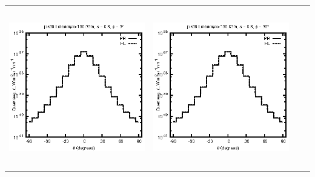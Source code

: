\begin{tabular}{c c c c}
\includegraphics[height=7cm]{../eps/jok08_Ld_sample_100.00m_fwd.eps} &
\includegraphics[height=7cm]{../eps/jok08_Ld_sample_100.00m_cross.eps} \\
\end{tabular}

\pagebreak

